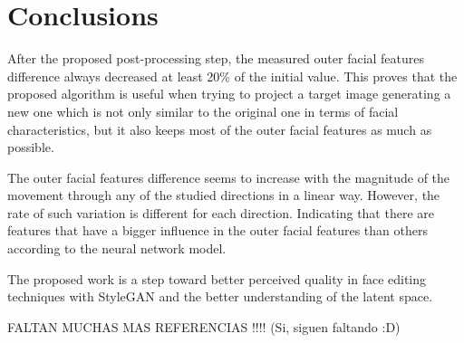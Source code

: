 \documentclass[review]{elsarticle}
\begin{document}
\section{Conclusions}\label{section:conclusions}

After the proposed post-processing step, the measured outer facial features difference always decreased at least 20\% of the initial value. This proves that the proposed algorithm is useful when trying to project a target image generating a new one which is not only similar to the original one in terms of facial characteristics, but it also keeps most of the outer facial features as much as possible.

The outer facial features difference seems to increase with the magnitude of the movement through any of the studied directions in a linear way. However, the rate of such variation is different for each direction. Indicating that there are features that have a bigger influence in the outer facial features than others according to the neural network model.

The proposed work is a step toward better perceived quality in face editing techniques with StyleGAN and the better understanding of the latent space.

FALTAN MUCHAS MAS REFERENCIAS !!!! (Si, siguen faltando :D)



\end{document}
